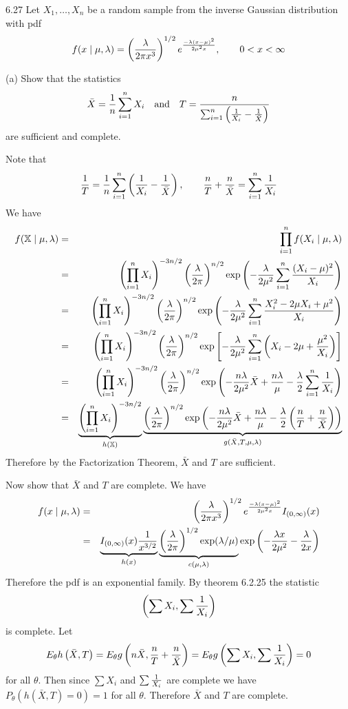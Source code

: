 \documentclass[12pt]{article}
\begin{document}
6.27
Let $X_1,\ldots,X_n$ be a random sample from the inverse Gaussian
distribution with pdf
$$f(x\mid\mu,\lambda)=\left({\lambda\over2\pi x^3}\right)^{1/2}
e^{-\lambda(x-\mu)^2\over2\mu^2x},\qquad0<x<\infty
$$

\bigskip
\noindent
(a) Show that the statistics
$$\bar X={1\over n}\sum_{i=1}^n X_i
\quad\hbox{and}\quad
T={n\over\sum_{i=1}^n\left({1\over X_i}-{1\over\bar X}\right)}
$$
are sufficient and complete.

\bigskip
\noindent
Note that
$${1\over T}={1\over n}\sum_{i=1}^n\left(
{1\over X_i}-{1\over\bar X}\right),\qquad
{n\over T}+{n\over\bar X}=\sum_{i=1}^n{1\over X_i}
$$
We have
\begin{eqnarray*}
f(\mathbb X\mid\mu,\lambda)&=&\prod_{i=1}^nf(X_i\mid\mu,\lambda)\\
&=&
\left(\prod_{i=1}^nX_i\right)^{-3n/2}
\left({\lambda\over2\pi}\right)^{n/2}
\exp\left(-{\lambda\over2\mu^2}\sum_{i=1}^n{(X_i-\mu)^2\over X_i}\right)\\
&=&
\left(\prod_{i=1}^nX_i\right)^{-3n/2}
\left({\lambda\over2\pi}\right)^{n/2}
\exp\left(
-{\lambda\over2\mu^2}\sum_{i=1}^n{X_i^2-2\mu X_i+\mu^2\over X_i}\right)\\
&=&
\left(\prod_{i=1}^nX_i\right)^{-3n/2}
\left({\lambda\over2\pi}\right)^{n/2}
\exp\left[
-{\lambda\over2\mu^2}\sum_{i=1}^n\left(
X_i-2\mu+{\mu^2\over X_i}\right)\right]\\
&=&
\left(\prod_{i=1}^nX_i\right)^{-3n/2}
\left({\lambda\over2\pi}\right)^{n/2}
\exp\left(
-{n\lambda\over2\mu^2}\bar X
+{n\lambda\over\mu}
-{\lambda\over2}\sum_{i=1}^n{1\over X_i}\right)\\
&=&
\underbrace{
\left(\prod_{i=1}^nX_i\right)^{-3n/2}}_{h(\mathbb X)}
\underbrace{
\left({\lambda\over2\pi}\right)^{n/2}
\exp\left(
-{n\lambda\over2\mu^2}\bar X
+{n\lambda\over\mu}
-{\lambda\over2}\left(
{n\over T}+{n\over\bar X}\right)\right)
}_{g(\bar X,T,\mu,\lambda)}
\end{eqnarray*}
Therefore by the Factorization Theorem, $\bar X$ and $T$ are
sufficient.

\bigskip
\noindent
Now show that $\bar X$ and $T$ are complete.
We have
\begin{eqnarray*}
f(x\mid\mu,\lambda)&=&
\left({\lambda\over2\pi x^3}\right)^{1/2}
e^{-\lambda(x-\mu)^2\over2\mu^2x}I_{(0,\infty)}(x)\\
&=&
\underbrace{
I_{(0,\infty)}(x){1\over x^{3/2}}}_{h(x)}
\underbrace{
\left({\lambda\over2\pi}\right)^{1/2}\exp(\lambda/\mu)
}_{c(\mu,\lambda)}
\exp\left(-{\lambda x\over2\mu^2}-{\lambda\over2x}\right)
\end{eqnarray*}
Therefore the pdf is an exponential family.
By theorem 6.2.25 the statistic
$$\left(\sum X_i,\sum{1\over X_i}\right)$$
is complete.
Let
$$E_\theta h\left(\bar X,T\right)
=E_\theta g\left(n\bar X,{n\over T}+{n\over\bar X}\right)
=E_\theta g\left(\sum X_i,\sum{1\over X_i}\right)=0$$
for all $\theta$.
Then since $\sum X_i$ and $\sum {1\over X_i}$ are complete we have
$P_\theta (h(\bar X, T)=0)=1$ for all $\theta$.
Therefore $\bar X$ and $T$ are complete.
\end{document}
